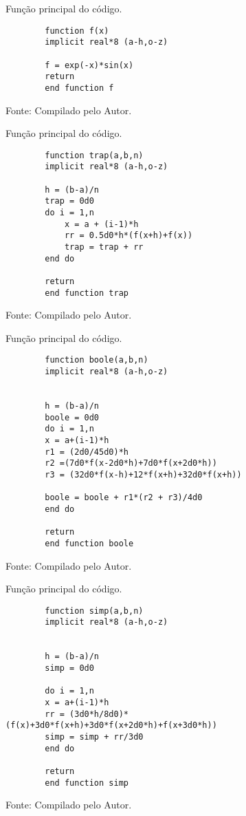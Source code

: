\begin{figure}[H]
\centering
\caption{Função principal do código.}
\centering

\begin{lstlisting}
        function f(x)
        implicit real*8 (a-h,o-z)

        f = exp(-x)*sin(x)
        return
        end function f
\end{lstlisting}

\caption*{Fonte: Compilado pelo Autor.}
\label{fig:tarefa 2 - função estudada}
\end{figure}

\begin{figure}[H]
\centering
\caption{Função principal do código.}
\centering

\begin{lstlisting}
        function trap(a,b,n)
        implicit real*8 (a-h,o-z)

        h = (b-a)/n
        trap = 0d0
        do i = 1,n
            x = a + (i-1)*h
            rr = 0.5d0*h*(f(x+h)+f(x))
            trap = trap + rr
        end do

        return
        end function trap
\end{lstlisting}

\caption*{Fonte: Compilado pelo Autor.}
\label{fig:tarefa 2 - função trap}
\end{figure}

\begin{figure}[H]
\centering
\caption{Função principal do código.}
\centering

\begin{lstlisting}
        function boole(a,b,n)
        implicit real*8 (a-h,o-z)


        h = (b-a)/n
        boole = 0d0
        do i = 1,n
        x = a+(i-1)*h
        r1 = (2d0/45d0)*h
        r2 =(7d0*f(x-2d0*h)+7d0*f(x+2d0*h))
        r3 = (32d0*f(x-h)+12*f(x+h)+32d0*f(x+h))

        boole = boole + r1*(r2 + r3)/4d0
        end do

        return
        end function boole
\end{lstlisting}

\caption*{Fonte: Compilado pelo Autor.}
\label{fig:tarefa 2 - função boole}
\end{figure}

\begin{figure}[H]
\centering
\caption{Função principal do código.}
\centering

\begin{lstlisting}
        function simp(a,b,n)
        implicit real*8 (a-h,o-z)


        h = (b-a)/n
        simp = 0d0

        do i = 1,n
        x = a+(i-1)*h
        rr = (3d0*h/8d0)*(f(x)+3d0*f(x+h)+3d0*f(x+2d0*h)+f(x+3d0*h))
        simp = simp + rr/3d0
        end do

        return
        end function simp
\end{lstlisting}

\caption*{Fonte: Compilado pelo Autor.}
\label{fig:tarefa 2 - função simp}
\end{figure}


